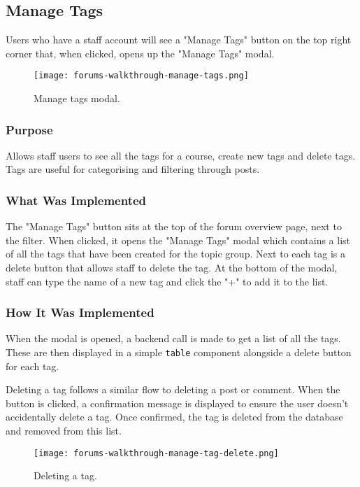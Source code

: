 \subsection{Manage Tags}
Users who have a staff account will see a "Manage Tags" button on the top right corner that, when clicked, opens up the "Manage Tags" modal.

\begin{figure}[h!]
    \texttt{[image: forums-walkthrough-manage-tags.png]}
    \centering
    \caption{Manage tags modal.}
\end{figure}

\subsubsection{Purpose}
Allows staff users to see all the tags for a course, create new tags and delete tags.
Tags are useful for categorising and filtering through posts.

\subsubsection{What Was Implemented}
The "Manage Tags" button sits at the top of the forum overview page, next to the filter.
When clicked, it opens the "Manage Tags" modal which contains a list of all the tags that have been created for the topic group.
Next to each tag is a delete button that allows staff to delete the tag.
At the bottom of the modal, staff can type the name of a new tag and click the "+" to add it to the list.

\subsubsection{How It Was Implemented}
When the modal is opened, a backend call is made to get a list of all the tags.
These are then displayed in a simple \texttt{table} component alongside a delete button for each tag.

Deleting a tag follows a similar flow to deleting a post or comment.
When the button is clicked, a confirmation message is displayed to ensure the user doesn't accidentally delete a tag.
Once confirmed, the tag is deleted from the database and removed from this list.

\begin{figure}[h!]
    \texttt{[image: forums-walkthrough-manage-tag-delete.png]}
    \centering
    \caption{Deleting a tag.}
\end{figure}

